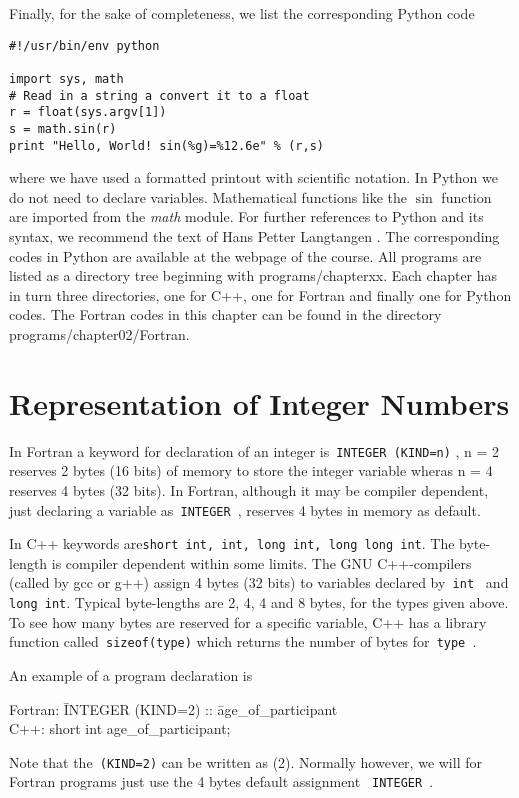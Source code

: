 Finally, for the sake of completeness, we list the corresponding Python code
\lstset{language=python}
\begin{lstlisting}[title={\href{{https://github.com/CompPhysics/CompPhysBook1/tree/master/doc/Programs/Chapter2/python/program1.cpp}}{Click here to view code}}]
#!/usr/bin/env python

import sys, math
# Read in a string a convert it to a float
r = float(sys.argv[1]) 
s = math.sin(r)
print "Hello, World! sin(%g)=%12.6e" % (r,s)
\end{lstlisting}
where we have used a formatted printout with scientific notation. 
In Python we do not need to declare variables. Mathematical functions like the $\sin$ 
function are imported from the {\em math} module.  For further references to Python
and its syntax, we recommend the text of Hans Petter Langtangen \cite{langtangen2009}.
The corresponding codes in Python are available at the webpage of the course.
All programs are listed as a directory tree beginning with programs/chapterxx.  Each chapter has in turn
three directories, one for C++, one for Fortran and finally one for Python codes.
The Fortran codes in this chapter can be found in the directory programs/chapter02/Fortran.
\section{Representation of Integer Numbers}

In Fortran a 
keyword for declaration of an integer is\verb? INTEGER (KIND=n)? ,
n = 2 reserves 2 bytes (16 bits) of memory to store the integer variable
wheras n = 4 reserves 4 bytes (32 bits).  In Fortran, although it may be
compiler dependent, just declaring a variable as\verb? INTEGER ?, reserves
4 bytes in memory as default. 

In C++ keywords are\verb?short int, int, long int, long long int?. The byte-length
is compiler dependent within some limits. The GNU C++-compilers (called by gcc or g++)
assign
4 bytes (32 bits) to variables declared by\verb? int ? and\verb? long int?. 
Typical byte-lengths
 are 2, 4, 4 and 8 bytes, for the types given above.
To see how many bytes are reserved for a specific variable, C++ has a
library function called\verb? sizeof(type)? which returns the number of
bytes for\verb? type ?. 

An example of a program declaration is
%
\begin{tabbing}
%
Fortran: \hspace*{1cm}\=INTEGER (KIND=2) :: \=age\_of\_participant\\
C++:                    \>short int           \>age\_of\_participant;
\end{tabbing}
%
Note that the\verb? (KIND=2)? can be written as (2). Normally however, we will 
for Fortran programs just use the 4 bytes default assignment 
\verb? INTEGER ?.

